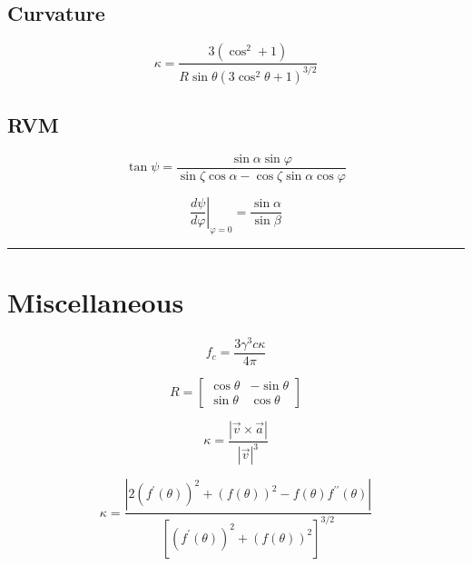 \documentclass[twocolumn]{article}
\newcommand{\phase}{\varphi}
\begin{document}
\subsection{Curvature}

\begin{equation}
    \kappa = \frac{3(\cos^2 + 1)}{R\sin\theta(3\cos^2\theta + 1)^{3/2}}
\end{equation}

\subsection{RVM}

\begin{equation}
    \tan{\psi} = \frac{\sin\alpha \sin\phase}{\sin\zeta\cos\alpha - \cos\zeta\sin\alpha\cos\phase}
\end{equation}

\begin{equation}
    \left.\frac{d\psi}{d\phase}\right|_{\phase=0} = \frac{\sin\alpha}{\sin\beta}
\end{equation}

\rule{\columnwidth}{1pt}

\section{Miscellaneous}

\begin{equation}
    f_c = \frac{3\gamma^3 c\kappa}{4\pi}
\end{equation}

\begin{equation}
    R = \begin{bmatrix}
        \cos\theta & -\sin\theta \\
        \sin\theta & \cos\theta
    \end{bmatrix}
\end{equation}

\begin{equation}
    \kappa = \frac{|\vec{v}\times\vec{a}|}{|\vec{v}|^3}
\end{equation}

\begin{equation}
    \kappa = \frac{|2(f^\prime(\theta))^2 + (f(\theta))^2 - f(\theta)f^{\prime\prime}(\theta)|}{\left[(f^\prime(\theta))^2 + (f(\theta))^2\right]^{3/2}}
\end{equation}
\end{document}

